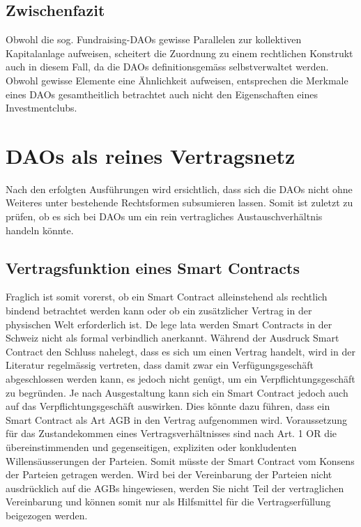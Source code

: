 \documentclass[a4paper,12pt]{report}
\begin{document}
	\subsection{Zwischenfazit}
	\startsubsection
	Obwohl die sog. Fundraising-DAOs gewisse Parallelen zur kollektiven Kapitalanlage aufweisen, scheitert die Zuordnung zu einem rechtlichen Konstrukt auch in diesem Fall, da die DAOs definitionsgemäss selbstverwaltet werden. Obwohl gewisse Elemente eine Ähnlichkeit aufweisen, entsprechen die Merkmale eines DAOs gesamtheitlich betrachtet auch nicht den Eigenschaften eines Investmentclubs.
	\closesection
	\closesection
	
	\section{DAOs als reines Vertragsnetz}
	\startsection
    Nach den erfolgten Ausführungen wird ersichtlich, dass sich die DAOs nicht ohne Weiteres unter bestehende Rechtsformen subsumieren lassen. Somit ist zuletzt zu prüfen, ob es sich bei DAOs um ein rein vertragliches Austauschverhältnis handeln könnte. 
    
    \subsection{Vertragsfunktion eines Smart Contracts}
	\startsubsection
	Fraglich ist somit vorerst, ob ein Smart Contract alleinstehend als rechtlich bindend betrachtet werden kann oder ob ein zusätzlicher Vertrag in der physischen Welt erforderlich ist. De lege lata werden Smart Contracts in der Schweiz nicht als formal verbindlich anerkannt. Während der Ausdruck Smart Contract den Schluss nahelegt, dass es sich um einen Vertrag handelt, wird in der Literatur regelmässig vertreten, dass damit zwar ein Verfügungsgeschäft abgeschlossen werden kann, es jedoch nicht genügt, um ein Verpflichtungsgeschäft zu begründen.  Je nach Ausgestaltung kann sich ein Smart Contract jedoch auch auf das Verpflichtungsgeschäft auswirken. Dies könnte dazu führen, dass ein Smart Contract als Art AGB in den Vertrag aufgenommen wird. Voraussetzung für das Zustandekommen eines Vertragsverhältnisses sind nach Art. 1 OR die übereinstimmenden und gegenseitigen, expliziten oder konkludenten Willensäusserungen der Parteien. Somit müsste der Smart Contract vom Konsens der Parteien getragen werden. Wird bei der Vereinbarung der Parteien nicht ausdrücklich auf die AGBs hingewiesen, werden Sie nicht Teil der vertraglichen Vereinbarung und können somit nur als Hilfsmittel für die Vertragserfüllung beigezogen werden. 
    \closesection
\end{document}
